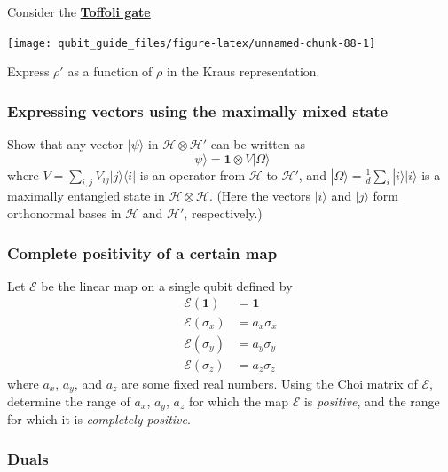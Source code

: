 \documentclass[fleqn,a4paper]{article}
\theoremstyle{definition}
\theoremstyle{definition}
\theoremstyle{definition}
\theoremstyle{definition}
\theoremstyle{remark}
\begin{document}
Consider the \href{https://en.wikipedia.org/wiki/Toffoli_gate}{\textbf{Toffoli gate}}

\begin{center}\texttt{[image: qubit\_guide\_files/figure-latex/unnamed-chunk-88-1]} \end{center}

Express \(\rho'\) as a function of \(\rho\) in the Kraus representation.

\hypertarget{vector-expression-omega}{%
\subsubsection{Expressing vectors using the maximally mixed state}\label{vector-expression-omega}}

Show that any vector \(|\psi\rangle\) in \(\mathcal{H}\otimes\mathcal{H}'\) can be written as
\[
  |\psi\rangle
  = \mathbf{1}\otimes V|\Omega\rangle
\]
where \(V=\sum_{i,j}V_{ij}|j\rangle\langle i|\) is an operator from \(\mathcal{H}\) to \(\mathcal{H}'\), and \(|\Omega\rangle=\frac{1}{d}\sum_i|i\rangle|i\rangle\) is a maximally entangled state in \(\mathcal{H}\otimes\mathcal{H}\).
(Here the vectors \(|i\rangle\) and \(|j\rangle\) form orthonormal bases in \(\mathcal{H}\) and \(\mathcal{H}'\), respectively.)

\hypertarget{complete-positivity-of-a-certain-map}{%
\subsubsection{Complete positivity of a certain map}\label{complete-positivity-of-a-certain-map}}

Let \(\mathcal{E}\) be the linear map on a single qubit defined by
\[
  \begin{aligned}
    \mathcal{E}(\mathbf{1})
    &= \mathbf{1}
  \\\mathcal{E}(\sigma_x)
    &= a_x\sigma_x
  \\\mathcal{E}(\sigma_y)
    &= a_y\sigma_y
  \\\mathcal{E}(\sigma_z)
    &= a_z\sigma_z
  \end{aligned}
\]
where \(a_x\), \(a_y\), and \(a_z\) are some fixed real numbers.
Using the Choi matrix of \(\mathcal{E}\), determine the range of \(a_x\), \(a_y\), \(a_z\) for which the map \(\mathcal{E}\) is \emph{positive}, and the range for which it is \emph{completely positive}.

\hypertarget{duals}{%
\subsubsection{Duals}\label{duals}}
\end{document}
